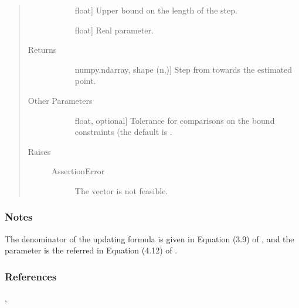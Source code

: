 \documentclass[letterpaper,10pt,english]{sphinxmanual}
\begin{document}
\begin{fulllineitems}
\begin{quote}
\begin{description}
\begin{description}
\item[{}] \leavevmode{[}float{]}
\sphinxAtStartPar
Upper bound on the length of the step.

\item[{}] \leavevmode{[}float{]}
\sphinxAtStartPar
Real parameter.

\end{description}

\item[{Returns}] \leavevmode\begin{description}
\item[{}] \leavevmode{[}numpy.ndarray, shape (n,){]}
\sphinxAtStartPar
Step from  towards the estimated point.

\end{description}

\item[{Other Parameters}] \leavevmode\begin{description}
\item[{}] \leavevmode{[}float, optional{]}
\sphinxAtStartPar
Tolerance for comparisons on the bound constraints (the default is
.

\end{description}

\item[{Raises}] \leavevmode\begin{description}
\item[{AssertionError}] \leavevmode
\sphinxAtStartPar
The vector  is not feasible.

\end{description}

\end{description}\end{quote}
\subsubsection*{Notes}

\sphinxAtStartPar
The denominator of the updating formula is given in Equation (3.9) of ,
and the parameter  is the referred in Equation (4.12) of .
\subsubsection*{References}

\sphinxAtStartPar
{}, 

\end{fulllineitems}
\end{document}
